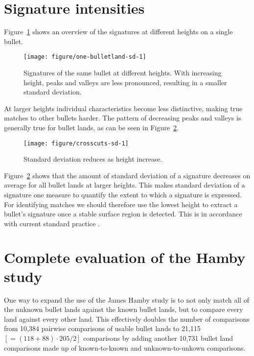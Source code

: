 \documentclass[aoas]{imsart}\usepackage[]{graphicx}\usepackage[]{color}
\newenvironment{knitrout}{}{} %
\begin{document}
\newpage
\section{Signature intensities}\label{supp:bulletbottom}

%
Figure~\ref{fig:overview} shows an overview of the signatures at different heights on a single bullet. 
\begin{figure}[hbtp]
\begin{knitrout}
\color{fgcolor}
\texttt{[image: figure/one-bulletland-sd-1]} 

\end{knitrout}
\caption{\label{fig:overview}Signatures of the same bullet at different heights.  With increasing height, peaks and valleys are less pronounced, resulting in a smaller standard deviation.}
\end{figure}
At larger heights  individual characteristics become less distinctive, making true matches to other bullets harder. The pattern of decreasing peaks and valleys is generally true for  bullet lands, as can be seen in Figure~\ref{fig:sds}. 
%
\begin{figure}[hbtp]
\centering
\begin{knitrout}
\color{fgcolor}
\texttt{[image: figure/crosscuts-sd-1]} 

\end{knitrout}
\caption{\label{fig:sds}Standard deviation reduces as height increase.}
\end{figure}
Figure~\ref{fig:sds} shows that the amount of standard deviation of a signature decreases on average for all bullet lands at larger heights.
This makes standard deviation of a signature one measure to quantify the extent to which a signature is expressed. For identifying matches we should therefore use the lowest height to extract a bullet's signature once a stable surface region is detected. This is in accordance with current standard practice \citep{afte:1992}.

\section{Complete evaluation of the Hamby study}\label{supp:extended}
One way to expand the use of the James Hamby study is to not only match all of the unknown bullet lands against the known bullet lands, but to compare every land against every other land. This effectively doubles the number of comparisons from 10,384 pairwise comparisons of usable bullet lands to 21,115 $\left[= (118+88)\cdot 205/2\right]$ comparisons by adding another 10,731 bullet land comparisons made up of known-to-known and unknown-to-unkown comparisons. 
\end{document}
